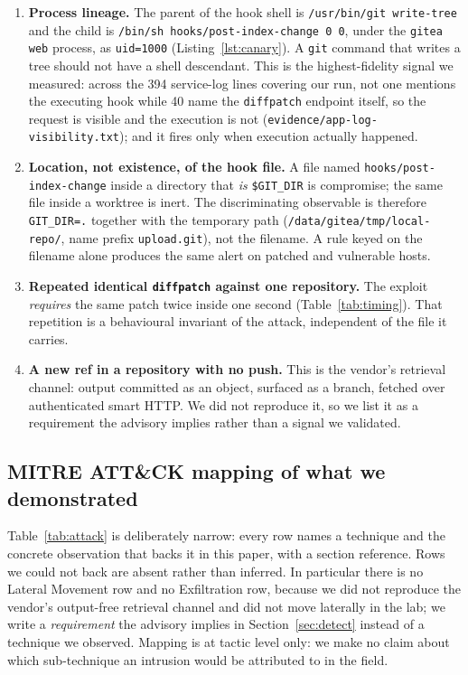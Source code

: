 \documentclass[journal]{IEEEtran}
\begin{document}
\begin{enumerate}
\item \textbf{Process lineage.} The parent of the hook shell is
\texttt{/usr/bin/git write-tree} and the child is \texttt{/bin/sh
hooks/post-index-change 0 0}, under the \texttt{gitea web} process, as
\texttt{uid=1000} (Listing~\ref{lst:canary}). A \texttt{git} command that writes
a tree should not have a shell descendant. This is the highest-fidelity signal we
measured: across the 394 service-log lines covering our run, not one mentions the
executing hook while 40 name the \texttt{diffpatch} endpoint itself, so the
request is visible and the execution is not
(\texttt{evidence/app-log-visibility.txt}); and it fires only when execution
actually happened.
\item \textbf{Location, not existence, of the hook file.} A file named
\texttt{hooks/post-index-change} inside a directory that \emph{is}
\texttt{\$GIT\_DIR} is compromise; the same file inside a worktree is inert. The
discriminating observable is therefore \texttt{GIT\_DIR=.} together with the
temporary path (\texttt{/data/gitea/tmp/local-repo/}, name prefix
\texttt{upload.git}), not the filename. A rule keyed on the filename alone
produces the same alert on patched and vulnerable hosts.
\item \textbf{Repeated identical \texttt{diffpatch} against one repository.} The
exploit \emph{requires} the same patch twice inside one second
(Table~\ref{tab:timing}). That repetition is a behavioural invariant of the
attack, independent of the file it carries.
\item \textbf{A new ref in a repository with no push.} This is the vendor's
retrieval channel: output committed as an object, surfaced as a branch, fetched
over authenticated smart HTTP. We did not reproduce it, so we list it as a
requirement the advisory implies rather than a signal we validated.
\end{enumerate}

\subsection{MITRE ATT\&CK mapping of what we demonstrated}

Table~\ref{tab:attack} is deliberately narrow: every row names a technique and the
concrete observation that backs it in this paper, with a section reference. Rows we
could not back are absent rather than inferred. In particular there is no Lateral
Movement row and no Exfiltration row, because we did not reproduce the vendor's
output-free retrieval channel and did not move laterally in the lab; we write a
\emph{requirement} the advisory implies in Section~\ref{sec:detect} instead of a
technique we observed. Mapping is at tactic level only: we make no claim about which
sub-technique an intrusion would be attributed to in the field.
\end{document}
